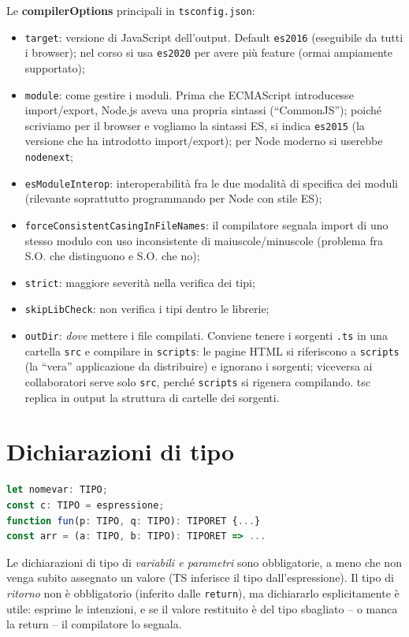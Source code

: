 Le \textbf{compilerOptions} principali in \texttt{tsconfig.json}:
\begin{itemize}
  \item \texttt{target}: versione di JavaScript dell'output. Default \texttt{es2016}
        (eseguibile da tutti i browser); nel corso si usa \texttt{es2020} per avere pi\`u
        feature (ormai ampiamente supportato);
  \item \texttt{module}: come gestire i moduli. Prima che ECMAScript introducesse
        import/export, Node.js aveva una propria sintassi (``CommonJS''); poich\'e scriviamo
        per il browser e vogliamo la sintassi ES, si indica \texttt{es2015} (la versione che
        ha introdotto import/export); per Node moderno si userebbe \texttt{nodenext};
  \item \texttt{esModuleInterop}: interoperabilit\`a fra le due modalit\`a di specifica dei
        moduli (rilevante soprattutto programmando per Node con stile ES);
  \item \texttt{forceConsistentCasingInFileNames}: il compilatore segnala import di uno
        stesso modulo con uso inconsistente di maiuscole/minuscole (problema fra S.O. che
        distinguono e S.O. che no);
  \item \texttt{strict}: maggiore severit\`a nella verifica dei tipi;
  \item \texttt{skipLibCheck}: non verifica i tipi dentro le librerie;
  \item \texttt{outDir}: \emph{dove} mettere i file compilati. Conviene tenere i sorgenti
        \texttt{.ts} in una cartella \texttt{src} e compilare in \texttt{scripts}: le pagine
        HTML si riferiscono a \texttt{scripts} (la ``vera'' applicazione da distribuire) e
        ignorano i sorgenti; viceversa ai collaboratori serve solo \texttt{src}, perch\'e
        \texttt{scripts} si rigenera compilando. tsc replica in output la struttura di
        cartelle dei sorgenti.
\end{itemize}

\section{Dichiarazioni di tipo}

\begin{lstlisting}[language=JavaScript]
let nomevar: TIPO;
const c: TIPO = espressione;
function fun(p: TIPO, q: TIPO): TIPORET {...}
const arr = (a: TIPO, b: TIPO): TIPORET => ...
\end{lstlisting}
Le dichiarazioni di tipo di \emph{variabili e parametri} sono obbligatorie, a meno che non
venga subito assegnato un valore (TS inferisce il tipo dall'espressione). Il tipo di
\emph{ritorno} non \`e obbligatorio (inferito dalle \texttt{return}), ma dichiararlo
esplicitamente \`e utile: esprime le intenzioni, e se il valore restituito \`e del tipo
sbagliato -- o manca la return -- il compilatore lo segnala.

